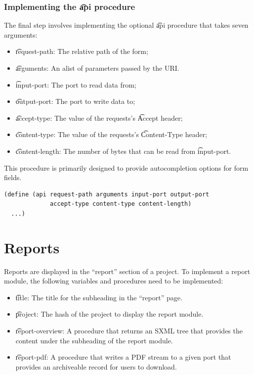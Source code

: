 \subsubsection{Implementing the \t{api} procedure}

  The final step involves implementing the optional \t{api} procedure
  that takes seven arguments:
  \begin{itemize}
  \item \t{request-path}:   The relative path of the form;
  \item \t{arguments}:      An alist of parameters passed by the URI.
  \item \t{input-port}:     The port to read data from;
  \item \t{output-port}:    The port to write data to;
  \item \t{accept-type}:    The value of the requests's \t{Accept} header;
  \item \t{content-type}:   The value of the requests's \t{Content-Type} header;
  \item \t{content-length}: The number of bytes that can be read from
    \t{input-port}.
  \end{itemize}

  This procedure is primarily designed to provide autocompletion options
  for form fields.

\begin{siderules}
\begin{verbatim}
(define (api request-path arguments input-port output-port
             accept-type content-type content-length)
  ...)
\end{verbatim}
\end{siderules}

\pagebreak{}
\section{Reports}
\label{sec:reports}

  Reports are displayed in the ``report'' section of a project.  To implement
  a report module, the following variables and procedures need to be implemented:
  \begin{itemize}
  \item \t{title}: The title for the subheading in the ``report'' page.
  \item \t{project}: The hash of the project to display the report module.
  \item \t{report-overview}: A procedure that returns an SXML tree that
    provides the content under the subheading of the report module.
  \item \t{report-pdf}: A procedure that writes a PDF stream to a given port
    that provides an archiveable record for users to download.
  \end{itemize}

